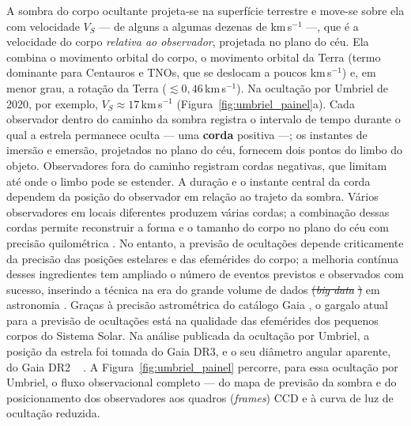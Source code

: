 \documentclass[msc]{on} %
\makeatletter
\providecommand{\DIFaddtex}[1]{{\protect\color{red}#1}} %
\providecommand{\DIFdeltex}[1]{{\protect\color{red}\sout{#1}}} %
\providecommand{\DIFaddbegin}{} %
\providecommand{\DIFaddend}{} %
\providecommand{\DIFdelbegin}{} %
\providecommand{\DIFdelend}{} %
\providecommand{\DIFadd}[1]{\texorpdfstring{\DIFaddtex{#1}}{#1}} %
\providecommand{\DIFdel}[1]{\texorpdfstring{\DIFdeltex{#1}}{}} %
\let\sout@orig\sout %
\renewcommand{\sout}[1]{\ifmmode\text{\sout@orig{\ensuremath{#1}}}\else\sout@orig{#1}\fi} %
\makeatother
\begin{document}
A sombra do corpo ocultante projeta-se na superfície terrestre e move-se sobre ela com velocidade \(V_S\) --- de alguns a algumas dezenas de km\,s\(^{-1}\) ---, que é a velocidade do corpo \emph{relativa ao observador}, projetada no plano do céu. Ela combina o movimento orbital do corpo, o movimento orbital da Terra (termo dominante para Centauros e TNOs, que se deslocam a poucos km\,s\(^{-1}\)) e, em menor grau, a rotação da Terra (\(\lesssim 0{,}46\)\,km\,s\(^{-1}\)). Na ocultação por Umbriel de 2020, por exemplo, \(V_S \approx 17\)\,km\,s\(^{-1}\) (Figura~\ref{fig:umbriel_painel}a). Cada observador dentro do caminho da sombra registra o intervalo de tempo durante o qual a estrela permanece oculta --- uma \textbf{corda} positiva ---; os instantes de imersão e emersão, projetados no plano do céu, fornecem dois pontos do limbo do objeto. Observadores fora do caminho registram cordas negativas, que limitam até onde o limbo pode se estender. A duração e o instante central da corda dependem da posição do observador em relação ao trajeto da sombra. Vários observadores em locais diferentes produzem várias cordas; a combinação dessas cordas permite reconstruir a forma e o tamanho do corpo no plano do céu com precisão quilométrica \citep{Ortiz2020, Umbriel2020}. No entanto, a previsão de ocultações depende criticamente da precisão das posições estelares e das efemérides do corpo; a melhoria contínua desses ingredientes tem ampliado o número de eventos previstos e observados com sucesso, inserindo a técnica na era do grande volume de dados \DIFdelbegin \DIFdel{(}\textit{\DIFdel{big data}}%
\DIFdel{) }\DIFdelend em astronomia \citep{SORA2022, Knieling2024}. Graças à precisão astrométrica do catálogo Gaia \citep{Gaia2016, GaiaDR3}, o gargalo atual para a previsão de ocultações está na qualidade das efemérides dos pequenos corpos do Sistema Solar. \DIFaddbegin \DIFadd{Na análise publicada da ocultação por Umbriel, a posição da estrela foi tomada do Gaia DR3, e o seu diâmetro angular aparente, do Gaia DR2 \mbox{%
\citep{Umbriel2020}}\hskip0pt%
. }\DIFaddend A Figura~\ref{fig:umbriel_painel} percorre, para essa ocultação por Umbriel, o fluxo observacional completo --- do mapa de previsão da sombra e do posicionamento dos observadores aos quadros \DIFaddbegin \DIFadd{(}\textit{\DIFadd{frames}}\DIFadd{) }\DIFaddend CCD e à curva de luz de ocultação reduzida.
\end{document}
